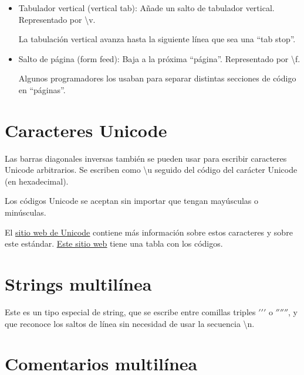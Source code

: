 \documentclass{report}
\newcommand{\doble}[1]{``#1''}
\begin{document}
{\begin{itemize}
  \item Tabulador vertical (vertical tab): Añade un salto de tabulador vertical. Representado por \textbackslash v.
  

  La tabulación vertical avanza hasta la siguiente línea que sea una \doble{tab stop}.

  \item Salto de página (form feed): Baja a la próxima \doble{página}. Representado por \textbackslash f.
  
  
  Algunos programadores los usaban para separar distintas secciones de código en \doble{páginas}.

\end{itemize}

\section{Caracteres Unicode}

Las barras diagonales inversas también se pueden usar para escribir caracteres Unicode arbitrarios. Se escriben como \textbackslash u seguido del código del carácter Unicode (en hexadecimal).

Los códigos Unicode se aceptan sin importar que tengan mayúsculas o minúsculas.


El \href{https://unicode.org/}{\underline{sitio web de Unicode}} contiene más información sobre estos caracteres y sobre este estándar. \href{https://unicode-table.com/en/}{\underline{Este sitio web}} tiene una tabla con los códigos.

\section{Strings multilínea}

Este es un tipo especial de string, que se escribe entre comillas triples $'$$'$$'$ o $''$$''$$''$, y que reconoce los saltos de línea sin necesidad de usar la secuencia \textbackslash n.


\section{Comentarios multilínea}

}
\end{document}
